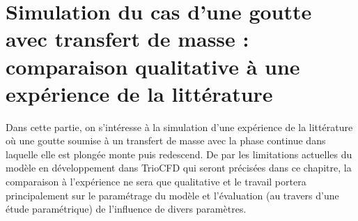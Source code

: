 \chapter{Simulation du cas d'une goutte avec transfert de masse : comparaison qualitative à une expérience de la littérature}

Dans cette partie, on s'intéresse à la simulation d'une expérience de la littérature où une goutte soumise à un transfert de masse avec la phase continue dans laquelle elle est plongée monte puis redescend. De par les limitations actuelles du modèle en développement dans TrioCFD qui seront précisées dans ce chapitre, la comparaison à l'expérience ne sera que qualitative et le travail portera principalement sur le paramétrage du modèle et l'évaluation (au travers d'une étude paramétrique) de l'influence de divers paramètres.


